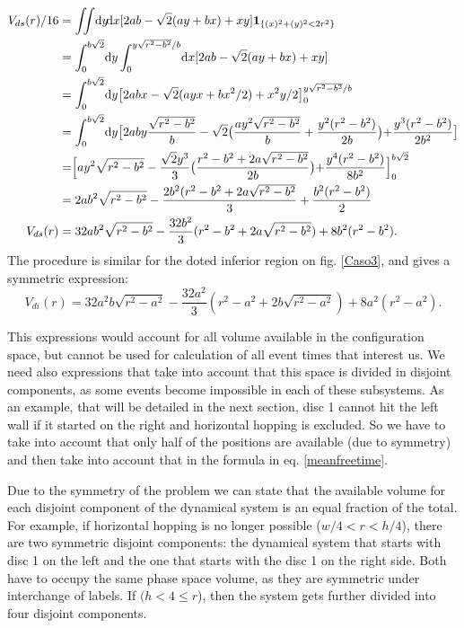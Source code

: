 \documentclass[letterpaper,10pt, jcp, aps]{revtex4-1}
\newcommand{\rd}{\!\mathrm{d}}
\newcommand{\indicator}[1]{\mathbf{1}_{ \{   #1 \} } }
\begin{document}
\begin{equation}
  \begin{split}
    V_{ds}(r) /16 &=\iint \rd y \rd x [2ab-\sqrt{2}(ay+bx)+xy] \indicator{(x)^2+(y)^2<2r^2 }\\
    &=\int_0^{b\sqrt{2}}\rd y \int_{0}^{y\sqrt{r^2-b^2}/b} \rd x [2ab-\sqrt{2}(ay+bx)+xy] \\
   &=\int_0^{b\sqrt{2}}\rd y \bigl[2abx-\sqrt{2}(ayx+bx^2/2)+x^2y/2\bigr]_{0}^{y\sqrt{r^2-b^2}/b} \\
      &=\int_0^{b\sqrt{2}}\rd y
        \bigr[
          2aby\frac{\sqrt{r^2-b^2}}{b}
          -\sqrt{2}
          \bigr(
          \frac{ay^2\sqrt{r^2-b^2}}{b}
            +\frac{y^2(r^2-b^2)}{2b}
            \bigl)
           +\frac{y^3(r^2-b^2)}{2b^2}
           \bigl]\\
        &= \Bigr[ay^2\sqrt{r^2-b^2}-
          \frac{\sqrt{2}y^3}{3}
          \bigr(
          \frac{r^2-b^2+2a\sqrt{r^2-b^2}}{2b}
            \bigl)
            +\frac{y^4(r^2-b^2)}{8b^2}
            \Bigl]_0^{b\sqrt{2}}\\
          &=2ab^2\sqrt{r^2-b^2}
          -\frac{2b^2(r^2-b^2+2a\sqrt{r^2-b^2}}{3}+\frac{b^2(r^2-b^2)}{2}\\
          V_{ds}(r)&=32ab^2\sqrt{r^2-b^2} -\frac{32
            b^2}{3}(r^2-b^2+2a\sqrt{r^2-b^2}) +8b^2(r^2-b^2).
  \end{split}
  \end{equation}
The procedure is similar for the doted inferior region on fig. \ref{Caso3},
and gives a symmetric expression:
\begin{equation}
          V_{di}(r)=32a^2b\sqrt{r^2-a^2} -\frac{32
            a^2}{3}(r^2-a^2+2b\sqrt{r^2-a^2}) +8a^2(r^2-a^2).
\end{equation}

This expressions would account for all volume available in the configuration space, but
cannot be used for calculation of all event times that interest us. We need also
expressions that take into account that this space is divided in disjoint components,
as some events become impossible in each of these subsystems. As an example,
that will be detailed in the next section, disc 1 cannot hit the left wall if
it started on the right and horizontal hopping is excluded. So we have to
take into account that only half of the positions are available (due to symmetry)
and then take into account that in the formula in eq. \ref{meanfreetime}.

Due to the symmetry of the problem we can state that the available volume
for each disjoint component of the dynamical system is an equal fraction
of the total. For example, if horizontal hopping is no longer possible
($w/4<r<h/4$), there are two symmetric disjoint components: the dynamical system
that starts with disc 1 on the left and the one that starts with the disc 1 on
the right side. Both have to occupy the same phase space volume, as they are
symmetric under interchange of labels. If $(h<4\leq r$), then the system gets further
divided into four disjoint components. 
\end{document}

